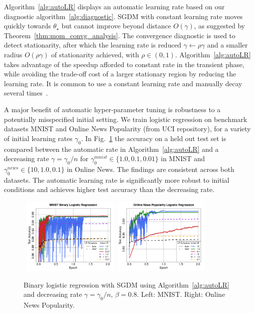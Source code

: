 \documentclass[conference]{IEEEtran}
\begin{document}
Algorithm~\ref{alg:autoLR} displays an automatic learning rate based on our diagnostic algorithm~\ref{alg:diagnostic}.
SGDM with constant learning rate moves quickly towards $\theta_\star$ but cannot improve beyond distance $O(\gamma)$, as suggested by Theorem~\ref{thm:mom_convg_analysis}.
The convergence diagnostic is used to detect stationarity, after which the learning rate is reduced $\gamma \gets \rho \gamma$ and a smaller radius $O(\rho \gamma)$ of stationarity achieved, with $\rho \in (0,1)$. Algorithm~\ref{alg:autoLR} takes advantage of the speedup afforded to constant rate in the transient phase, while avoiding the trade-off cost of a larger stationary region by reducing the learning rate. 
It is common to use a constant learning rate and manually decay several times~\cite{Proc:He_CVPR16,Article:Krizhevsky_CACM17}.

A major benefit of automatic hyper-parameter tuning is robustness to a potentially misspecified initial setting. 
We train logistic regression on benchmark datasets MNIST and Online News Popularity (from UCI repository), for a variety of initial learning rates $\gamma_0$.
In Fig.~\ref{fig:mnist_news_binary} the accuracy on a held out test set is compared between the automatic rate in Algorithm~\ref{alg:autoLR} and a decreasing rate $\gamma = \gamma_0 / n$ for $\gamma_0^{mnist} \in \{1.0, 0.1, 0.01\}$ in MNIST and $\gamma_0^{news} \in \{10, 1.0, 0.1\}$ in Online News.
The findings are consistent across both datasets.
The automatic learning rate is significantly more robust to initial conditions and achieves higher test accuracy than the decreasing rate. 

\begin{figure}[t]
\mbox{\hspace{-0.1in}
  \includegraphics[width=1.85in]{fig/mnist_binary.pdf}\hspace{-0.12in}
\includegraphics[width=1.85in]{fig/news_popularity.pdf}
}
\vspace{-0.16in}
  \caption{Binary logistic regression  with SGDM using Algorithm~\ref{alg:autoLR} and decreasing rate $\gamma = \gamma_0 / n$,
  $\beta = 0.8$. Left: MNIST. Right: Online News Popularity.
  }
\label{fig:mnist_news_binary}\vspace{-0.13in}
\end{figure}
\end{document}
